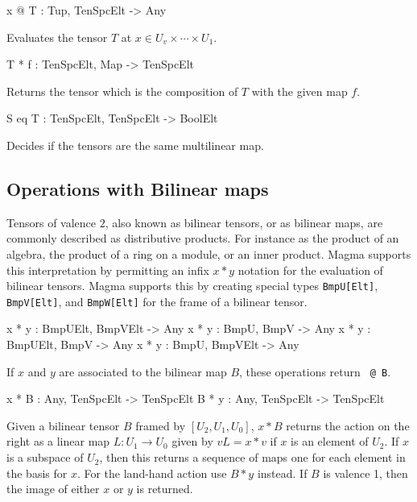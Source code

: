 \begin{intrinsics}
x @ T : Tup, TenSpcElt -> Any
\end{intrinsics}

Evaluates the tensor $T$ at $x\in U_v\times \cdots \times U_1$.

\begin{intrinsics}
T * f : TenSpcElt, Map -> TenSpcElt
\end{intrinsics}

Returns the tensor which is the composition of $T$ with the given map $f$.

\begin{intrinsics}
S eq T : TenSpcElt, TenSpcElt -> BoolElt
\end{intrinsics}

Decides if the tensors are the same multilinear map.

\subsection{Operations with Bilinear maps}
Tensors of valence $2$, also known as bilinear tensors, or
as bilinear maps,  are commonly described as distributive products.
For instance as the product of an algebra, the product of a ring on 
a module, or an inner product.  Magma supports this interpretation 
by permitting an infix $x*y$ notation for the evaluation of bilinear
tensors.  Magma supports this by creating special types 
{\tt BmpU[Elt]}, {\tt BmpV[Elt]}, and {\tt BmpW[Elt]} for the frame
of a bilinear tensor.


\begin{intrinsics}
x * y : BmpUElt, BmpVElt -> Any
x * y : BmpU, BmpV -> Any
x * y : BmpUElt, BmpV -> Any
x * y : BmpU, BmpVElt -> Any
\end{intrinsics}

If $x$ and $y$ are associated to the bilinear map $B$, these operations return 
{\tt <x,y> @ B}.

\begin{intrinsics}
x * B : Any, TenSpcElt -> TenSpcElt
B * y : Any, TenSpcElt -> TenSpcElt
\end{intrinsics}

Given a bilinear tensor $B$ framed by $[U_2,U_1,U_0]$,
$x*B$ returns the action on the right as a 
linear map $L : U_1\rightarrow U_0$ given 
by $vL = x* v$ if $x$ is an element of $U_2$. 
If $x$ is a subspace of $U_2$, then this returns a sequence of 
maps one for each element in the basis for $x$.
For the land-hand action use $B*y$ instead.
If $B$ is valence 1, then the image of either $x$ or $y$ is returned.

